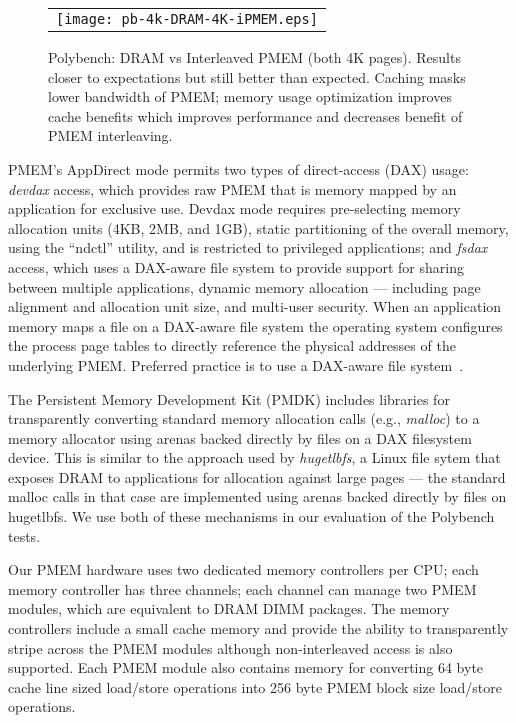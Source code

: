 
\begin{figure}[!th]
  \captionsetup{justification=centering}
  \centering
  \caption{Polybench: DRAM vs Interleaved PMEM (both 4K pages).  Results closer to expectations but still better than expected.  Caching masks lower bandwidth of PMEM; memory usage optimization improves cache benefits which improves performance and decreases benefit of PMEM interleaving.}
  \vspace{2mm}
  \label{fig:polybench:dram-vs-ipmem-4k}
  \begin{tabular}{c}
    \texttt{[image: pb-4k-DRAM-4K-iPMEM.eps]}
  \end{tabular}
\end{figure}


PMEM's AppDirect mode permits two types of direct-access (DAX) usage: \textit{devdax} access, which provides raw PMEM that is memory mapped by an application for exclusive use. Devdax mode requires pre-selecting memory allocation units (4KB, 2MB, and 1GB), static partitioning of the overall memory, using the ``ndctl'' utility, and is restricted to privileged applications; and \textit{fsdax} access, which uses a DAX-aware file system to provide support for sharing between multiple applications, dynamic memory allocation --- including page alignment and allocation unit size, and multi-user security.  When an application memory maps a file on a DAX-aware file system the operating system configures the process page tables to directly reference the physical addresses of the underlying PMEM.  Preferred practice is to use a DAX-aware file system~\cite{rudoff2019NVMProgrammingModel}.


The Persistent Memory Development Kit (PMDK) includes libraries for transparently converting standard memory allocation calls (e.g., \textit{malloc}) to a memory allocator using arenas backed directly by files on a DAX filesystem device.  This is similar to the approach used by \textit{hugetlbfs}, a Linux file sytem that exposes DRAM to applications for allocation against large pages --- the standard malloc calls in that case are implemented using arenas backed directly by files on hugetlbfs.  We use both of these mechanisms in our evaluation of the Polybench tests.

Our PMEM hardware uses two dedicated memory controllers per CPU; each memory controller has three channels; each channel can manage two PMEM modules, which are equivalent to DRAM DIMM packages.   The memory controllers include a small cache memory and provide the ability to transparently stripe across the PMEM modules although non-interleaved access is also supported.  Each PMEM module also contains memory for converting 64 byte cache line sized load/store operations into 256 byte PMEM block size load/store operations.

